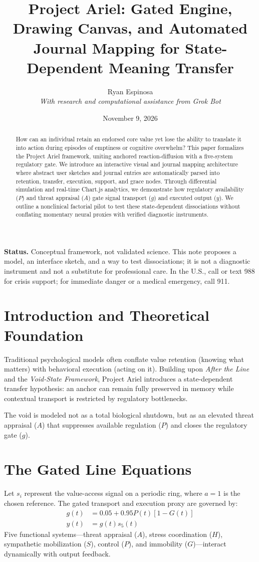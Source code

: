 \documentclass[11pt, a4paper]{article}
\title{Project Ariel: Gated Engine, Drawing Canvas, and Automated Journal Mapping for State-Dependent Meaning Transfer}
\author{Ryan Espinosa \\ \textit{With research and computational assistance from Grok Bot}}
\date{November 9, 2026}
\begin{document}
\maketitle

\noindent\textbf{Status.} Conceptual framework, not validated science. This note proposes a model, an interface sketch, and a way to test dissociations; it is not a diagnostic instrument and not a substitute for professional care. In the U.S., call or text 988 for crisis support; for immediate danger or a medical emergency, call 911.

\begin{abstract}
How can an individual retain an endorsed core value yet lose the ability to translate it into action during episodes of emptiness or cognitive overwhelm? This paper formalizes the Project Ariel framework, uniting anchored reaction-diffusion with a five-system regulatory gate. We introduce an interactive visual and journal mapping architecture where abstract user sketches and journal entries are automatically parsed into retention, transfer, execution, support, and grace nodes. Through differential simulation and real-time Chart.js analytics, we demonstrate how regulatory availability ($P$) and threat appraisal ($A$) gate signal transport ($g$) and executed output ($y$). We outline a nonclinical factorial pilot to test these state-dependent dissociations without conflating momentary neural proxies with verified diagnostic instruments.
\end{abstract}

\section{Introduction and Theoretical Foundation}
Traditional psychological models often conflate value retention (knowing what matters) with behavioral execution (acting on it). Building upon \textit{After the Line} and the \textit{Void-State Framework}, Project Ariel introduces a state-dependent transfer hypothesis: an anchor can remain fully preserved in memory while contextual transport is restricted by regulatory bottlenecks.

The void is modeled not as a total biological shutdown, but as an elevated threat appraisal ($A$) that suppresses available regulation ($P$) and closes the regulatory gate ($g$).

\section{The Gated Line Equations}
Let $s_i$ represent the value-access signal on a periodic ring, where $a=1$ is the chosen reference. The gated transport and execution proxy are governed by:
\begin{align}
g(t) &= 0.05 + 0.95P(t)[1 - G(t)] \\
y(t) &= g(t) s_5(t)
\end{align}
Five functional systems---threat appraisal ($A$), stress coordination ($H$), sympathetic mobilization ($S$), control ($P$), and immobility ($G$)---interact dynamically with output feedback.
\end{document}

